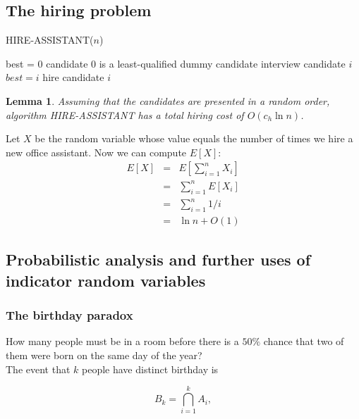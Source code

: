 \documentclass[12pt]{article}
\newtheorem{lemma}[theorem]{Lemma}
\begin{document}
\subsection{The hiring problem}

HIRE-ASSISTANT($n$)
\begin{algorithmic}[1]
\State best = 0
\Comment candidate $0$ is a least-qualified dummy candidate
	\State interview candidate $i$
        	\State $best = i$
                \State hire candidate $i$
        \EndIf
\EndFor
\end{algorithmic}

\begin{lemma}
  Assuming that the candidates are presented in a random order, algorithm HIRE-ASSISTANT has a total hiring cost of $O(c_h \ln n)$.
\end{lemma}

Let $X$ be the random variable whose value equals the number of times we hire a new office assistant. Now we can compute $E[X]$:
\begin{eqnarray*}
  E[X]
  &=& E \left[ \sum_{i=1}^n X_i \right] \\
  &=& \sum_{i=1}^n E[X_i] \\
  &=& \sum_{i=1}^n 1/i \\
  &=& \ln n + O(1)
\end{eqnarray*}

\subsection{Probabilistic analysis and further uses of indicator random variables}

\subsubsection{The birthday paradox}

How many people must be in a room before there is a $50 \%$ chance that two of them were born on the same day of the year? \\

The event that $k$ people have distinct birthday is

\begin{equation*}
  B_k = \bigcap_{i=1}^k A_i,
\end{equation*}
\end{document}
